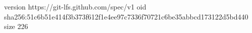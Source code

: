 version https://git-lfs.github.com/spec/v1
oid sha256:51c6b51e414f3b373f612f1e4ee97c7336f70721c6be35abbcd173122d5bd440
size 226
